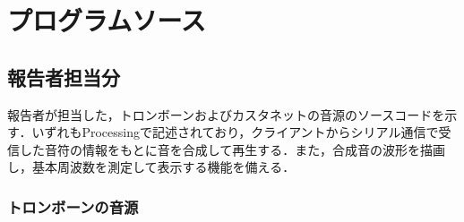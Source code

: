 \section{プログラムソース}

\subsection{報告者担当分}
報告者が担当した，トロンボーンおよびカスタネットの音源のソースコードを示す．いずれもProcessingで記述されており，クライアントからシリアル通信で受信した音符の情報をもとに音を合成して再生する．また，合成音の波形を描画し，基本周波数を測定して表示する機能を備える．

\subsubsection{トロンボーンの音源}

